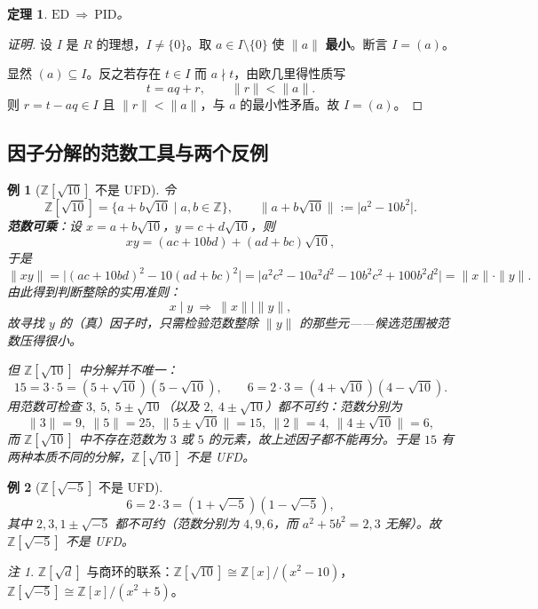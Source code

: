 \documentclass[11pt,a4paper]{ctexart}
\newtheorem*{theorem}{定理}
\newtheorem*{example}{例}
\theoremstyle{remark}
\newtheorem*{remark}{注}
\begin{document}
\begin{theorem}
$\mathrm{ED}\ \Longrightarrow\ \mathrm{PID}$。
\end{theorem}

\begin{proof}[证明]
设 $I$ 是 $R$ 的理想，$I\neq\{0\}$。取 $a\in I\setminus\{0\}$ 使 $\|a\|$ \textbf{最小}。断言 $I=(a)$。

显然 $(a)\subseteq I$。反之若存在 $t\in I$ 而 $a\nmid t$，由欧几里得性质写
\[
t=aq+r,\qquad \|r\|<\|a\| .
\]
则 $r=t-aq\in I$ 且 $\|r\|<\|a\|$，与 $a$ 的最小性矛盾。故 $I=(a)$。
\end{proof}

\subsection*{因子分解的范数工具与两个反例}

\begin{example}[{$\mathbb{Z}[\sqrt{10}]$ 不是 UFD}]
令
\[
\mathbb{Z}[\sqrt{10}]=\{a+b\sqrt{10}\mid a,b\in\mathbb{Z}\},\qquad
\bigl\|a+b\sqrt{10}\bigr\|:=\bigl|a^{2}-10b^{2}\bigr| .
\]
\textbf{范数可乘}：设 $x=a+b\sqrt{10}$，$y=c+d\sqrt{10}$，则
\[
xy=(ac+10bd)+(ad+bc)\sqrt{10},
\]
于是
\[
\|xy\|=\bigl|(ac+10bd)^{2}-10(ad+bc)^{2}\bigr|
=\bigl|a^{2}c^{2}-10a^{2}d^{2}-10b^{2}c^{2}+100b^{2}d^{2}\bigr|
=\|x\|\cdot\|y\| .
\]
由此得到判断整除的实用准则：
\[
x\mid y\ \Longrightarrow\ \|x\|\mid\|y\| ,
\]
故寻找 $y$ 的（真）因子时，只需检验范数整除 $\|y\|$ 的那些元——候选范围被范数压得很小。

但 $\mathbb{Z}[\sqrt{10}]$ 中分解并不唯一：
\[
15=3\cdot 5=(5+\sqrt{10})(5-\sqrt{10}),\qquad
6=2\cdot 3=(4+\sqrt{10})(4-\sqrt{10}).
\]
用范数可检查 $3,\ 5,\ 5\pm\sqrt{10}$（以及 $2,\ 4\pm\sqrt{10}$）都不可约：范数分别为
\[
\|3\|=9,\ \|5\|=25,\ \|5\pm\sqrt{10}\|=15,\ \|2\|=4,\ \|4\pm\sqrt{10}\|=6,
\]
而 $\mathbb{Z}[\sqrt{10}]$ 中不存在范数为 $3$ 或 $5$ 的元素，故上述因子都不能再分。于是 $15$ 有两种本质不同的分解，$\mathbb{Z}[\sqrt{10}]$ 不是 UFD。
\end{example}

\begin{example}[{$\mathbb{Z}[\sqrt{-5}]$ 不是 UFD}]
\[
6=2\cdot 3=(1+\sqrt{-5})(1-\sqrt{-5}),
\]
其中 $2,3,1\pm\sqrt{-5}$ 都不可约（范数分别为 $4,9,6$，而 $a^{2}+5b^{2}=2,3$ 无解）。故 $\mathbb{Z}[\sqrt{-5}]$ 不是 UFD。
\end{example}

\begin{remark}
$\mathbb{Z}[\sqrt{d}]$ 与商环的联系：$\mathbb{Z}[\sqrt{10}]\cong\mathbb{Z}[x]/(x^{2}-10)$，$\mathbb{Z}[\sqrt{-5}]\cong\mathbb{Z}[x]/(x^{2}+5)$。
\end{remark}
\end{document}
